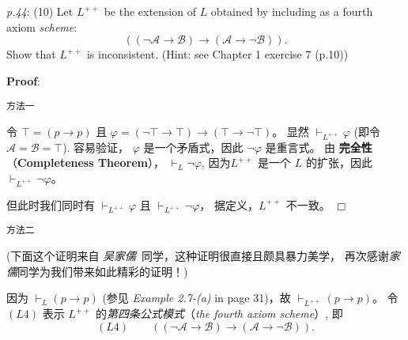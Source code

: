 \documentclass[UTF8,12pt,a4paper]{ctexart}
\begin{document}
\vspace{3em}  
\noindent\emph{p.44}: (10) \quad
Let $L^{++}$ be the extension of $L$ obtained by including as a fourth axiom \textit{scheme}:
\[
( (\neg \mathscr{A} \to \mathscr{B}) \to (\mathscr{A} \to \neg \mathscr{B})).
\]
Show that $L^{++}$ is inconsistent. (Hint: see Chapter 1 exercise 7 (p.10)) 


\noindent\textbf{Proof}:

\noindent\texttt{方法一}

令 
$\top = (p \to p)$ 且 $\varphi = (\neg \top \to \top)  \to (\top \to \neg \top)$。
显然
$ \vdash_{L^{++}} \varphi$ (即令 $\mathscr{A} = \mathscr{B} = \top$). 
容易验证， $\varphi$ 是一个矛盾式，因此 $\neg \varphi$ 是重言式。
由 \textbf{完全性}（\textbf{Completeness Theorem}）， $\vdash_L \neg \varphi$, 
因为$L^{++}$ 是一个 $L$ 的扩张，因此 $\vdash_{L^{++}} \neg \varphi$。

但此时我们同时有 $\vdash_{L^{++}} \varphi$ 且 $\vdash_{L^{++}} \neg \varphi$，
据定义，$L^{++}$  不一致。
\hfill $\Box$


\vspace{1em}
\noindent\texttt{方法二}

(下面这个证明来自 \textit{吴家儒}\ 同学，这种证明很直接且颇具暴力美学，
再次感谢\textit{家儒}同学为我们带来如此精彩的证明！)

因为 $\vdash_L (p \to p)$ (参见 \textit{Example 2.7-(a)} in page 31)，故
$ \vdash_{L^{++}} (p \to p) $。
令 $(L4)$ 表示 $L^{++}$ 的\textit{第四条公式模式}（\textit{the fourth axiom scheme}）, 即
\[
(L4) \qquad ( (\neg \mathscr{A} \to \mathscr{B}) \to (\mathscr{A} \to \neg \mathscr{B})).
\]
\end{document}
